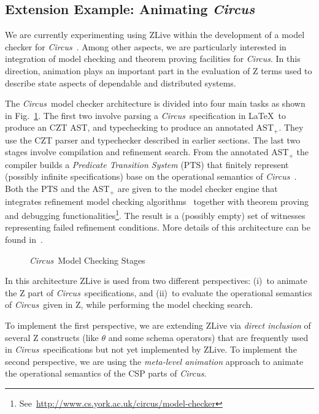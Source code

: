 \documentclass{llncs}
\newcommand{\Circus}{{\sf\slshape Circus}}
\begin{document}
\subsection{Extension Example: Animating \Circus}

    We are currently experimenting using ZLive within the development
    of a model checker for \Circus~\cite{circus.mc:leo}. Among other aspects,
    we are particularly interested in integration of model checking and
    theorem proving facilities for \Circus. In this direction, animation plays
    an important part in the evaluation of Z terms used to describe state
    aspects of dependable and distributed systems.

    The \Circus\ model checker architecture is divided into four main
    tasks as shown in Fig.~\ref{mc-stages}.  The first two involve
    parsing a \Circus\ specification in \LaTeX\ to produce an CZT AST,
    and typechecking to produce an annotated AST$_{+}$.
    They use the CZT parser and typechecker described in earlier sections.
    The last two stages involve compilation and refinement search.
    From the annotated AST$_{+}$ the compiler builds a \textit{Predicate Transition System}
    (PTS) that finitely represent (possibly infinite specifications) base on the
    operational semantics of \Circus~\cite{circus.mc:opsem}. Both the PTS and
    the AST$_{+}$ are given to the model checker engine that integrates refinement
    model checking algorithms~\cite{csp.mc:main,csp.mc:bissequiv}
    together with theorem proving and debugging
    functionalities\footnote{See~\url{http://www.cs.york.ac.uk/circus/model-checker}}.
    The result is a (possibly empty) set of witnesses representing failed
    refinement conditions. More details of this architecture can be found in~\cite{circus.mc:leo}.
    \begin{figure}[t]
        \begin{center}
        \end{center} \caption{\Circus\ Model Checking Stages}\label{mc-stages}
    \end{figure}

    In this architecture ZLive is used from two different perspectives:
    (i)~to animate the Z part of \Circus\ specifications, and
    (ii)~to evaluate the operational semantics of \Circus\ given in Z, 
    while performing the model checking search.

    To implement the first perspective, we are extending ZLive via
    \emph{direct inclusion} of several Z constructs (like $\theta$ and
    some schema operators) that are frequently used in \Circus\
    specifications but not yet implemented by ZLive.  To implement the
    second perspective, we are using the \emph{meta-level animation}
    approach to animate the operational semantics of the CSP parts of
    \Circus.
\end{document}

